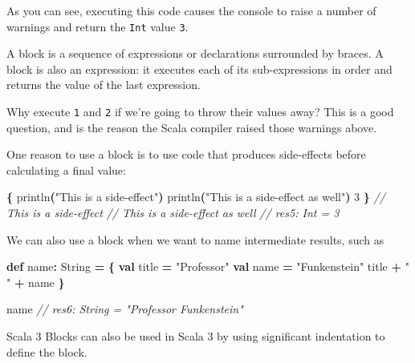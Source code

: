 \documentclass[11pt,a5paper,]{book}
\newenvironment{Shaded}{\begin{snugshade}}{\end{snugshade}}
\newcommand{\CommentTok}[1]{\textcolor[rgb]{0.56,0.35,0.01}{\textit{#1}}}
\newcommand{\DecValTok}[1]{\textcolor[rgb]{0.00,0.00,0.81}{#1}}
\newcommand{\ExtensionTok}[1]{#1}
\newcommand{\FunctionTok}[1]{\textcolor[rgb]{0.00,0.00,0.00}{#1}}
\newcommand{\KeywordTok}[1]{\textcolor[rgb]{0.13,0.29,0.53}{\textbf{#1}}}
\newcommand{\NormalTok}[1]{#1}
\newcommand{\OperatorTok}[1]{\textcolor[rgb]{0.81,0.36,0.00}{\textbf{#1}}}
\newcommand{\StringTok}[1]{\textcolor[rgb]{0.31,0.60,0.02}{#1}}
\begin{document}
As you can see, executing this code causes the console to raise a number
of warnings and return the \texttt{Int} value \texttt{3}.

A block is a sequence of expressions or declarations surrounded by
braces. A block is also an expression: it executes each of its
sub-expressions in order and returns the value of the last expression.

Why execute \texttt{1} and \texttt{2} if we're going to throw their
values away? This is a good question, and is the reason the Scala
compiler raised those warnings above.

One reason to use a block is to use code that produces side-effects
before calculating a final value:

\begin{Shaded}
\begin{Highlighting}[]
\OperatorTok{\{}
  \FunctionTok{println}\OperatorTok{(}\StringTok{"This is a side{-}effect"}\OperatorTok{)}
  \FunctionTok{println}\OperatorTok{(}\StringTok{"This is a side{-}effect as well"}\OperatorTok{)}
  \DecValTok{3}
\OperatorTok{\}}
\CommentTok{// This is a side{-}effect}
\CommentTok{// This is a side{-}effect as well}
\CommentTok{// res5: Int = 3}
\end{Highlighting}
\end{Shaded}

We can also use a block when we want to name intermediate results, such
as

\begin{Shaded}
\begin{Highlighting}[]
\KeywordTok{def}\NormalTok{ name}\OperatorTok{:} \ExtensionTok{String} \OperatorTok{=} \OperatorTok{\{}
  \KeywordTok{val}\NormalTok{ title }\OperatorTok{=} \StringTok{"Professor"}
  \KeywordTok{val}\NormalTok{ name }\OperatorTok{=} \StringTok{"Funkenstein"}
\NormalTok{  title }\OperatorTok{+} \StringTok{" "} \OperatorTok{+}\NormalTok{ name}
\OperatorTok{\}}
\end{Highlighting}
\end{Shaded}

\begin{Shaded}
\begin{Highlighting}[]
\NormalTok{name}
\CommentTok{// res6: String = "Professor Funkenstein"}
\end{Highlighting}
\end{Shaded}

Scala 3 Blocks can also be used in Scala 3 by using significant
indentation to define the block.
\end{document}
